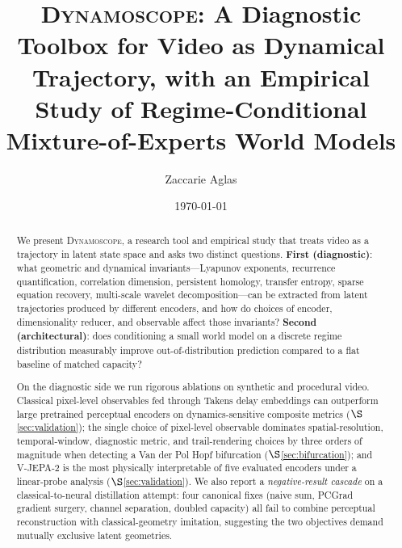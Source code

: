 \documentclass[11pt,a4paper]{article}
\title{\textsc{Dynamoscope}: A Diagnostic Toolbox for Video as
Dynamical Trajectory, with an Empirical Study of Regime-Conditional
Mixture-of-Experts World Models}
\author{Zaccarie Aglas}
\affil{Independent Researcher, Paris, France \\ \texttt{zaccarie@zaccarie.fr}}
\date{\today}
\begin{document}
\maketitle

\begin{abstract}
We present \textsc{Dynamoscope}, a research tool and empirical study
that treats video as a trajectory in latent state space and asks two
distinct questions. \textbf{First (diagnostic)}: what geometric and
dynamical invariants---Lyapunov exponents, recurrence quantification,
correlation dimension, persistent homology, transfer entropy, sparse
equation recovery, multi-scale wavelet decomposition---can be
extracted from latent trajectories produced by different encoders,
and how do choices of encoder, dimensionality reducer, and
observable affect those invariants? \textbf{Second (architectural)}:
does conditioning a small world model on a discrete regime
distribution measurably improve out-of-distribution prediction
compared to a flat baseline of matched capacity?

On the diagnostic side we run rigorous ablations on synthetic and
procedural video. Classical pixel-level observables fed through
Takens delay embeddings can outperform large pretrained perceptual
encoders on dynamics-sensitive composite metrics
($\S$\ref{sec:validation}); the single choice of pixel-level
observable dominates spatial-resolution, temporal-window, diagnostic
metric, and trail-rendering choices by three orders of magnitude
when detecting a Van der Pol Hopf bifurcation
($\S$\ref{sec:bifurcation}); and V-JEPA-2 is the most physically
interpretable of five evaluated encoders under a linear-probe
analysis ($\S$\ref{sec:validation}). We also report a
\emph{negative-result cascade} on a classical-to-neural distillation
attempt: four canonical fixes (naive sum, PCGrad gradient surgery,
channel separation, doubled capacity) all fail to combine perceptual
reconstruction with classical-geometry imitation, suggesting the two
objectives demand mutually exclusive latent geometries.


\end{abstract}
\end{document}
